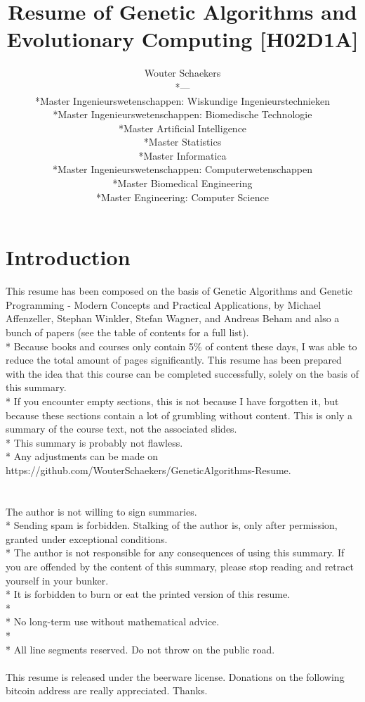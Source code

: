 \documentclass[12pt]{book}
\title{Resume of Genetic Algorithms and Evolutionary Computing [H02D1A]}
\author{Wouter Schaekers\\*---\\*Master Ingenieurswetenschappen: Wiskundige Ingenieurstechnieken\\*Master Ingenieurswetenschappen: Biomedische Technologie\\*Master Artificial Intelligence\\*Master Statistics\\*Master Informatica\\*Master Ingenieurswetenschappen: Computerwetenschappen\\*Master Biomedical Engineering\\*Master Engineering: Computer Science}
\begin{document}
\maketitle
\setcounter{section}{-1}
\setcounter{page}{0}
\renewcommand{\contentsname}{Table of Contents}
\setcounter{tocdepth}{3}
\tableofcontents
\clearpage
\chapter*{Introduction}
This resume has been composed on the basis of Genetic Algorithms and Genetic Programming - Modern Concepts and Practical Applications, by Michael Affenzeller, Stephan Winkler, Stefan Wagner, and Andreas Beham and also a bunch of papers (see the table of contents for a full list).\\*
Because books and courses only contain 5\% of content these days, I was able to reduce the total amount of pages significantly. This resume has been prepared with the idea that this course can be completed successfully, solely on the basis of this summary.\\*
If you encounter empty sections, this is not because I have forgotten it, but because these sections contain a lot of grumbling without content.
This is only a summary of the course text, not the associated slides.\\*
This summary is probably not flawless.\\*
Any adjustments can be made on https://github.com/WouterSchaekers/GeneticAlgorithms-Resume.\\\\\\
The author is not willing to sign summaries.\\*
Sending spam is forbidden. Stalking of the author is, only after permission, granted under exceptional conditions.\\*
The author is not responsible for any consequences of using this summary. If you are offended by the content of this summary, please stop reading and retract yourself in your bunker.\\*
It is forbidden to burn or eat the printed version of this resume.\\*\\*
No long-term use without mathematical advice.\\*\\*
All line segments reserved. Do not throw on the public road.\\\\
This resume is released under the beerware license. Donations on the following bitcoin address are really appreciated. Thanks.\\\\
\end{document}
